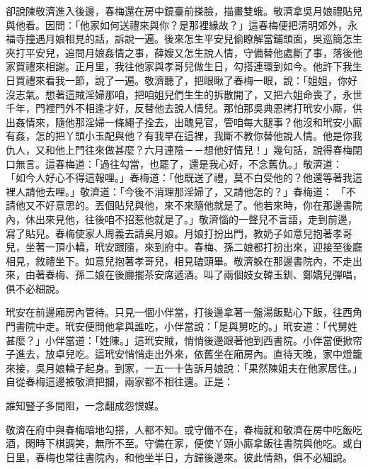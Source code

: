 卻說陳敬濟進入後邊，春梅還在房中鏡臺前搽臉，描畫雙蛾。敬濟拿吳月娘禮貼兒與他看。因問：「他家如何送禮來與你？是那裡緣故？」這春梅便把清明郊外，永福寺撞遇月娘相見的話，訴說一遍。後來怎生平安兒偷瞭解當鋪頭面，吳巡簡怎生夾打平安兒，追問月娘姦情之事，薛嫂又怎生說人情，守備替他處斷了事，落後他家買禮來相謝。正月里，我往他家與孝哥兒做生日，勾搭連環到如今。他許下我生日買禮來看我一節，說了一遍。敬濟聽了，把眼瞅了春梅一眼，說：「姐姐，你好沒志氣。想著這賊淫婦那咱，把咱姐兒們生生的拆散開了，又把六姐命喪了，永世千年，門裡門外不相逢才好，反替他去說人情兒。那怕那吳典恩拷打玳安小廝，供出姦情來，隨他那淫婦一條繩子拴去，出醜見官，管咱每大腿事？他沒和玳安小廝有姦，怎的把丫頭小玉配與他？有我早在這裡，我斷不教你替他說人情。他是你我仇人，又和他上門往來做甚麼？六月連陰－－想他好情兒！」幾句話，說得春梅閉口無言。這春梅道：「過往勾當，也罷了，還是我心好，不念舊仇。」敬濟道： 「如今人好心不得這報哩。」春梅道：「他既送了禮，莫不白受他的？他還等著我這裡人請他去哩。」敬濟道：「今後不消理那淫婦了，又請他怎的？」春梅道： 「不請他又不好意思的。丟個貼兒與他，來不來隨他就是了。他若來時，你在那邊書院內，休出來見他，往後咱不招惹他就是了。」敬濟惱的一聲兒不言語，走到前邊，寫了貼兒。春梅使家人周義去請吳月娘。月娘打扮出門，教奶子如意兒抱著孝哥兒，坐著一頂小轎，玳安跟隨，來到府中。春梅、孫二娘都打扮出來，迎接至後廳相見，敘禮坐下。如意兒抱著孝哥兒，相見磕頭畢。敬濟躲在那邊書院內，不走出來，由著春梅、孫二娘在後廳擺茶安席遞酒。叫了兩個妓女韓玉釧、鄭嬌兒彈唱，俱不必細說。

玳安在前邊廂房內管待。只見一個小伴當，打後邊拿著一盤湯飯點心下飯，往西角門書院中走。玳安便問他拿與誰吃，小伴當說：「是與舅吃的。」玳安道：「代舅姓甚麼？」小伴當道：「姓陳。」這玳安賊，悄悄後邊跟著他到西書院。小伴當便掀帘子進去，放卓兒吃。這玳安悄悄走出外來，依舊坐在廂房內。直待天晚，家中燈籠來接，吳月娘轎子起身。到家，一五一十告訴月娘說：「果然陳姐夫在他家居住。」自從春梅這邊被敬濟把攔，兩家都不相往還。正是：

誰知豎子多間阻，一念翻成怨恨媒。

敬濟在府中與春梅暗地勾搭，人都不知。或守備不在，春梅就和敬濟在房中吃飯吃酒，閑時下棋調笑，無所不至。守備在家，便使丫頭小廝拿飯往書院與他吃。或白日里，春梅也常往書院內，和他坐半日，方歸後邊來。彼此情熱，俱不必細說。

